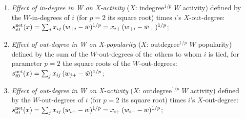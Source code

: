\documentclass[a4paper,fleqn]{article}
\newcommand{\+}{\, + \,}
\newcommand{\vit}{\theenumi}
\begin{document}
{\begin{enumerate}
 \item {\em Effect of in-degree in W on X-activity } ($X$: indegree$^{1/p}$ $W$ activity)
 defined by the $W$-in-degrees of $i$ (for $p = 2$ its square root)
 times $i$'s $X$-out-degree:\\
 $s^{\rm net}_{i\vit}(x) =  \sum_j x_{ij}\, (w_{+i} - \bar w)^{1/p}
                 =  x_{i+}\, (w_{+i} - \bar w_{+.}) ^{1/p} $;\\

 \item {\em Effect of out-degree in W on X-popularity } ($X$: outdegree$^{1/p}$ $W$ popularity)
 defined by   the sum of  the $W$-out-degrees of the others to whom $i$ is tied,
 for parameter $p = 2$ the square roots of the $W$-out-degrees:\\
 $s^{\rm net}_{i\vit}(x) =  \sum_j x_{ij}\, (w_{j+} - \bar w)^{1/p}  $;\\

 \item {\em Effect of out-degree  in W on X-activity } ($X$: outdegree$^{1/p}$ $W$ activity)
 defined by the $W$-out-degrees of $i$ (for $p = 2$ its square root)
 times $i$'s $X$-out-degree:\\
 $s^{\rm net}_{i\vit}(x) =  \sum_j x_{ij}\, (w_{i+} - \bar w)^{1/p} =
                           x_{i+}\, (w_{i+} - \bar w)^{1/p} $;\\


\end{enumerate}}
\end{document}
